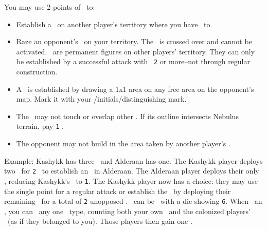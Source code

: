 You may use 2 points of \power\ to:
\begin{itemize}
  \item Establish a \battleship\ on another player’s territory where you have \reach\ to.
  \item Raze an opponent’s \battleship\ on your territory.  The \battleship\ is crossed over and cannot be activated.  \battleships\ are permanent figures on other players’ territory.  They can only be established by a successful attack with \power\ \texttt{2} or more--not through regular construction.
  \item A \battleship\ is established by drawing a 1x1 area on any free area on the opponent’s map.  Mark it with your \insignia/initials/distinguishing mark.
  \item The \battleship\ may not touch or overlap other \fortifications.  If its outline intersects Nebulus terrain, pay \texttt{1} \currency.
  \item The opponent may not build in the area taken by another player’s \battleship.
\end{itemize}
Example: Kashykk has three \squadrons\ and Alderaan has one.  The Kashykk player deploys two \squadrons\ for \texttt{2} \power\ to establish an \battleship\ in Alderaan.  The Alderaan player deploys their only \squadron, reducing Kashykk’s \power\ to \texttt{1}.  The Kashykk player now has a choice: they may use the single point for a regular attack or establish the \battleship\ by deploying their remaining \squadron\ for a total of \texttt{2} unopposed \power.
\newline\newline
\battleships\ can be \activated\ with a die showing \texttt{6}. When \activating\ an \battleship, you can \activate\ any one \fortification\ type, counting both your own \fortifications\ and the colonized players’ \fortifications\ (as if they belonged to you).  Those players then gain one \unhappiness.
